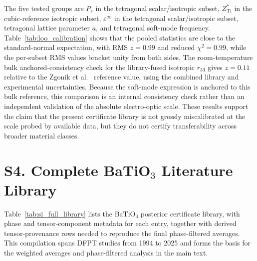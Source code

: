\documentclass[onecolumn,superscriptaddress,amsmath,amssymb,longbibliography]{revtex4-2}
\begin{document}
The five tested groups are $P_s$ in the tetragonal scalar/isotropic subset,
$Z^*_{\mathrm{Ti}}$ in the cubic-reference isotropic subset,
$\varepsilon^\infty$ in the tetragonal scalar/isotropic subset, tetragonal
lattice parameter $a$, and tetragonal soft-mode frequency. Table~\ref{tab:loo_calibration}
shows that the pooled statistics are close to the standard-normal expectation,
with RMS $z=0.99$ and reduced $\chi^2=0.99$, while the per-subset RMS values
bracket unity from both sides. The room-temperature bulk anchored-consistency
check for the library-fused isotropic $r_{33}$ gives $z=0.11$ relative to the
Zgonik et al.\ \cite{Zgonik1994} reference value, using the combined library and experimental
uncertainties. Because the soft-mode expression is anchored to this bulk
reference, this comparison is an internal consistency check rather than an
independent validation of the absolute electro-optic scale. These results
support the claim that the present certificate library is not grossly
miscalibrated at the scale probed by available data, but they do not certify
transferability across broader material classes.


\section{S4. Complete BaTiO$_3$ Literature Library}
\label{sec:si_library}

Table~\ref{tab:si_full_library} lists the BaTiO$_3$
posterior certificate library, with phase and tensor-component metadata
for each entry, together with derived tensor-provenance rows needed to
reproduce the final phase-filtered averages. This compilation spans DFPT
studies from 1994 to 2025 and forms the basis for the weighted averages and
phase-filtered analysis in the main text.
\end{document}
